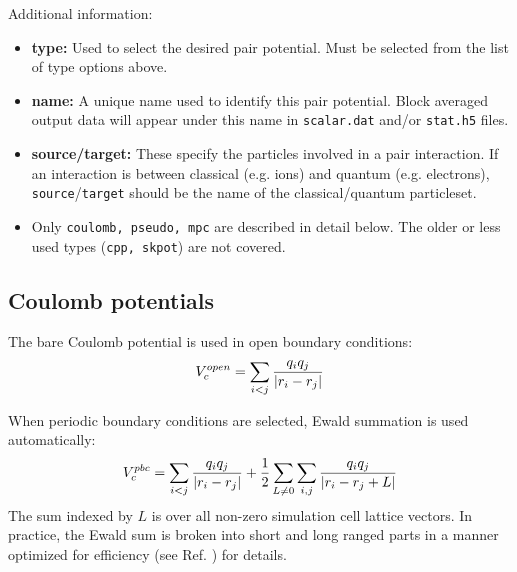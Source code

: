 Additional information:
\begin{itemize}
  \item{\textbf{type:} Used to select the desired pair potential.  Must be selected from the list of type options above.}
  \item{\textbf{name:} A unique name used to identify this pair potential.  Block averaged output data will appear under this name in \texttt{scalar.dat} and/or \texttt{stat.h5} files.}
  \item{\textbf{source/target:}  These specify the particles involved in a pair interaction.  If an interaction is between classical (e.g. ions) and quantum (e.g. electrons), \texttt{source}/\texttt{target} should be the name of the classical/quantum particleset.}
  \item{Only \texttt{coulomb, pseudo, mpc} are described in detail below.  The older or less used types (\texttt{cpp, skpot}) are not covered.}
\end{itemize}







\subsection{Coulomb potentials}

The bare Coulomb potential is used in open boundary conditions:
\begin{align}
  V_c^{open} = \sum_{i<j}\frac{q_iq_j}{\lvert r_i-r_j \rvert}
\end{align}

When periodic boundary conditions are selected, Ewald summation is used automatically:
\begin{align}\label{eq:ewald}
  V_c^{pbc} = \sum_{i<j}\frac{q_iq_j}{\lvert r_i-r_j \rvert} + \frac{1}{2}\sum_{L\ne0}\sum_{i,j}\frac{q_iq_j}{\lvert r_i-r_j+L \rvert}
\end{align}
The sum indexed by $L$ is over all non-zero simulation cell lattice vectors.  In practice, the Ewald sum is broken into short and long ranged parts in a manner optimized for efficiency (see Ref. \cite{Natoli1995}) for details. 

